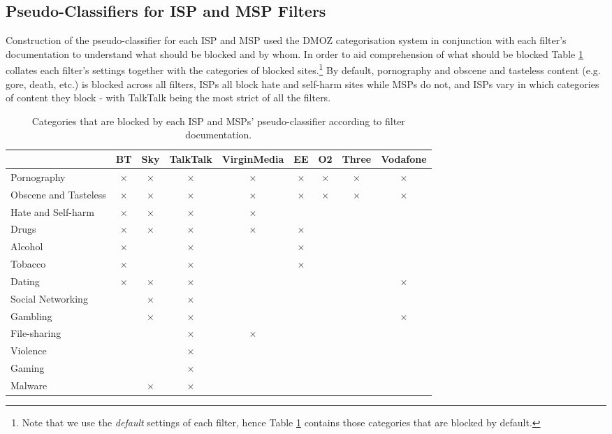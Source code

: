\documentclass{bmcart}
\begin{document}
\subsection*{Pseudo-Classifiers for ISP and MSP Filters}
Construction of the pseudo-classifier for each ISP and MSP used the DMOZ categorisation system in conjunction with each filter's documentation to understand what should be blocked and by whom.
In order to aid comprehension of what should be blocked Table \ref{tab:pseudo_classifiers} collates each filter's settings together with the categories of blocked sites.\footnote{Note that we use the \emph{default} settings of each filter, hence Table \ref{tab:pseudo_classifiers}  contains those categories that are blocked by default.}
By default, pornography and obscene and tasteless content (e.g. gore, death, etc.) is blocked across all filters, ISPs all block hate and self-harm sites while MSPs do not, and ISPs vary in which categories of content they block - with TalkTalk being the most strict of all the filters.

\begin{table}[h!]
\caption{Categories that are blocked by each ISP and MSPs' pseudo-classifier according to filter documentation.}
  \begin{tabular}{ l | c c c c | c c c c }
    \hline
	& BT & Sky & TalkTalk & VirginMedia & EE & O2 & Three & Vodafone \\
    \hline
    Pornography & $\times$ & $\times$ & $\times$ & $\times$ & $\times$ & $\times$ & $\times$ & $\times$ \\ 
    Obscene and Tasteless & $\times$ & $\times$ & $\times$ & $\times$ & $\times$ & $\times$ & $\times$ & $\times$ \\
    Hate and Self-harm & $\times$ & $\times$ & $\times$ & $\times$ & \\   
	Drugs & $\times$ & $\times$ & $\times$ & $\times$ & $\times$ \\
	Alcohol & $\times$ & & $\times$ & & $\times$ \\
	Tobacco & $\times$ & & $\times$ & & $\times$ \\	
	Dating & $\times$ & $\times$ & $\times$ & & & & & $\times$ \\
	Social Networking & & $\times$ & $\times$ & & \\
	Gambling & & $\times$ & $\times$ & & & & & $\times$ \\
	File-sharing & & & $\times$ & $\times$ & \\
	Violence & & & $\times$ & & \\
	Gaming & & & $\times$ & & \\
	Malware & & $\times$ & $\times$ & & \\
    \hline
  \end{tabular}
  \label{tab:pseudo_classifiers}
\end{table}
\end{document}
